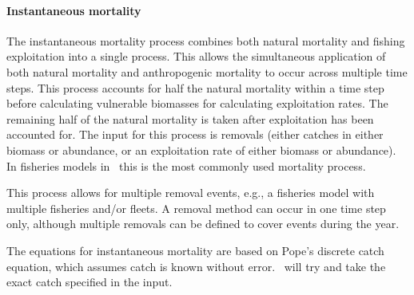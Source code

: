 \paragraph{Instantaneous mortality}\label{sec:Process-MortalityInstantaneous}

The instantaneous mortality process combines both natural mortality and fishing exploitation into a single process. This allows the simultaneous application of both natural mortality and anthropogenic mortality to occur across multiple time steps. This process accounts for half the natural mortality within a time step before calculating vulnerable biomasses for calculating exploitation rates. The remaining half of the natural mortality is taken after exploitation has been accounted for. The input for this process is removals (either catches in either biomass or abundance, or an exploitation rate of either biomass or abundance). In fisheries models in \CNAME\ this is the most commonly used mortality process.

This process allows for multiple removal events, e.g., a fisheries model with multiple fisheries and/or fleets. A removal method can occur in one time step only, although multiple removals can be defined to cover events during the year.

The equations for instantaneous mortality are based on Pope's discrete catch equation, which assumes catch is known without error. \CNAME\ will try and take the exact catch specified in the input.


